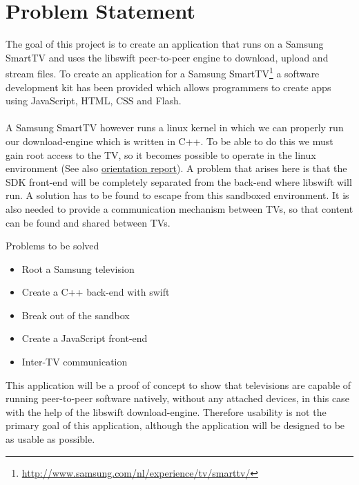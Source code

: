 \chapter{Problem Statement}
\label{sec:problems}
The goal of this project is to create an application that runs on a Samsung SmartTV and uses the libswift peer-to-peer engine to download, upload and stream files. To create an application for a Samsung SmartTV\footnote{\url{http://www.samsung.com/nl/experience/tv/smarttv/}} a software development kit has been provided which allows programmers to create apps using JavaScript, HTML, CSS and Flash.\\\\
A Samsung SmartTV however runs a linux kernel in which we can properly run our download-engine which is written in C++. To be able to do this we must gain root access to the TV, so it becomes possible to operate in the linux environment (See also \hyperref[sec:orientation]{orientation report}). A problem that arises here is that the SDK front-end will be completely separated from the back-end where libswift will run. A solution has to be found to escape from this sandboxed environment. It is also needed to provide a communication mechanism between TV\textquotesingle s,
so that content can be found and shared between TV\textquotesingle s.

Problems to be solved
\begin{itemize}
\item Root a Samsung television
\item Create a C++ back-end with swift
\item Break out of the sandbox
\item Create a JavaScript front-end
\item Inter-TV communication
\end{itemize}

This application will be a proof of concept to show that televisions are capable of running peer-to-peer software natively, without any attached
devices, in this case with the help of the libswift download-engine. Therefore usability is not the primary goal of this application, 
although the application will be designed to be as usable as possible.
